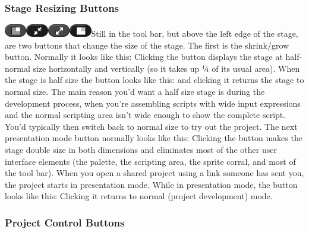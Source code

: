 \subsubsection{Stage Resizing Buttons}\label{stage-resizing-buttons}

\includegraphics[width=0.37917in,height=0.21667in]{media/image1033.png}\includegraphics[width=0.37917in,height=0.21667in]{media/image1034.png}\includegraphics[width=0.37917in,height=0.21667in]{media/image1035.png}\includegraphics[width=0.37917in,height=0.21667in]{media/image1036.png}Still
in the tool bar, but above the left edge of the stage, are two buttons
that change the size of the stage. The first is the shrink/grow button.
Normally it looks like this: Clicking the button displays the stage at
half-normal size horizontally and vertically (so it takes up ¼ of its
usual area). When the stage is half size the button looks like this: and
clicking it returns the stage to normal size. The main reason you'd want
a half size stage is during the development process, when you're
assembling scripts with wide input expressions and the normal scripting
area isn't wide enough to show the complete script. You'd typically then
switch back to normal size to try out the project. The next presentation
mode button normally looks like this: Clicking the button makes the
stage double size in both dimensions and eliminates most of the other
user interface elements (the palette, the scripting area, the sprite
corral, and most of the tool bar). When you open a shared project using
a link someone has sent you, the project starts in presentation mode.
While in presentation mode, the button looks like this: Clicking it
returns to normal (project development) mode.

\subsubsection*{Project Control Buttons}\label{project-control-buttons}

